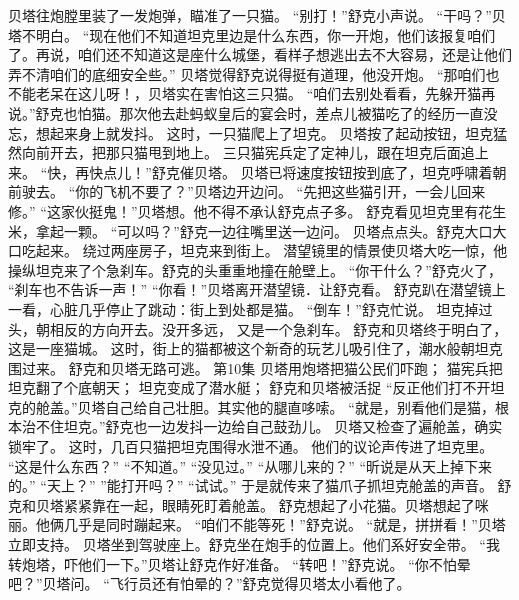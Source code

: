 \documentclass[a4paper,12pt,UTF8,twoside]{ctexbook}
\begin{document}
        贝塔往炮膛里装了一发炮弹，瞄准了一只猫。 
        “别打！”舒克小声说。 
        “干吗？”贝塔不明白。 
        “现在他们不知道坦克里边是什么东西，你一开炮，他们该报复咱们了。再说，咱们还不知道这是座什么城堡，看样子想逃出去不大容易，还是让他们弄不清咱们的底细安全些。” 
        贝塔觉得舒克说得挺有道理，他没开炮。 
        “那咱们也不能老呆在这儿呀！，贝塔实在害怕这三只猫。 
        “咱们去别处看看，先躲开猫再说。”舒克也怕猫。那次他去赴蚂蚁皇后的宴会时，差点儿被猫吃了的经历一直没忘，想起来身上就发抖。 
        这时，一只猫爬上了坦克。 
        贝塔按了起动按钮，坦克猛然向前开去，把那只猫甩到地上。 
        三只猫宪兵定了定神儿，跟在坦克后面追上来。 
        “快，再快点儿！”舒克催贝塔。 
        贝塔已将速度按钮按到底了，坦克呼啸着朝前驶去。 
        “你的飞机不要了？”贝塔边开边问。 
        “先把这些猫引开，一会儿回来修。” 
        “这家伙挺鬼！”贝塔想。他不得不承认舒克点子多。 
        舒克看见坦克里有花生米，拿起一颗。 
        “可以吗？”舒克一边往嘴里送一边问。 
        贝塔点点头。舒克大口大口吃起来。 
        绕过两座房子，坦克来到街上。 
        潜望镜里的情景使贝塔大吃一惊，他操纵坦克来了个急刹车。舒克的头重重地撞在舱壁上。 
        “你干什么？”舒克火了，  “刹车也不告诉一声！” 
        “你看！”贝塔离开潜望镜．让舒克看。 
        舒克趴在潜望镜上一看，心脏几乎停止了跳动：街上到处都是猫。 
        “倒车！”舒克忙说。 
        坦克掉过头，朝相反的方向开去。没开多远， 
        又是一个急刹车。 
        舒克和贝塔终于明白了，这是一座猫城。 
        这时，街上的猫都被这个新奇的玩艺儿吸引住了，潮水般朝坦克围过来。 
        舒克和贝塔无路可逃。   第10集 
        贝塔用炮塔把猫公民们吓跑； 
        猫宪兵把坦克翻了个底朝天； 
        坦克变成了潜水艇； 
        舒克和贝塔被活捉       
        “反正他们打不开坦克的舱盖。”贝塔自己给自己壮胆。其实他的腿直哆嗦。 
        “就是，别看他们是猫，根本治不住坦克。”舒克也一边发抖一边给自己鼓劲儿。 
        贝塔又检查了遍舱盖，确实锁牢了。 
        这时，几百只猫把坦克围得水泄不通。 
        他们的议论声传进了坦克里。 
        “这是什么东西？” 
        “不知道。” 
        “没见过。” 
        “从哪儿来的？” 
        “昕说是从天上掉下来的。” 
        “天上？” 
        ”能打开吗？” 
        “试试。” 
        于是就传来了猫爪子抓坦克舱盖的声音。 
        舒克和贝塔紧紧靠在一起，眼睛死盯着舱盖。 
        舒克想起了小花猫。贝塔想起了咪丽。他俩几乎是同时蹦起来。 
        “咱们不能等死！”舒克说。 
        “就是，拼拼看！”贝塔立即支持。 
        贝塔坐到驾驶座上。舒克坐在炮手的位置上。他们系好安全带。 
        “我转炮塔，吓他们一下。”贝塔让舒克作好准备。 
        “转吧！”舒克说。 
        “你不怕晕吧？”贝塔问。 
        “飞行员还有怕晕的？”舒克觉得贝塔太小看他了。 
\end{document}
